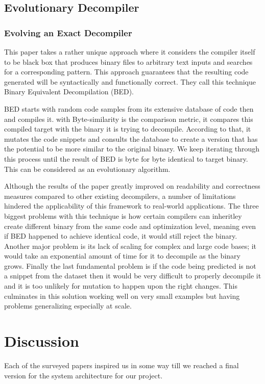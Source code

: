 \documentclass[conference,a4paper]{IEEEtran}
\begin{document}
\subsection{Evolutionary Decompiler}

\subsubsection{Evolving an Exact Decompiler}

This paper takes a rather unique approach where it considers the compiler itself to be black box that produces binary files to arbitrary text inputs and searches for a corresponding pattern.
This approach guarantees that the resulting code generated will be syntactically and functionally correct.
They call this technique Binary Equivalent Decompilation (BED).

BED starts with random code samples from its extensive database of code then and compiles it.
with Byte-similarity is the comparison metric, it compares this compiled target with the binary it is trying to decompile.
According to that, it mutates the code snippets and consults the database to create a version that has the potential to be more similar to the original binary.
We keep iterating through this process until the result of BED is byte for byte identical to target binary.
This can be considered as an evolutionary algorithm.

Although the results of the paper greatly improved on readability and correctness measures compared to other existing decompilers, a number of limitations hindered the applicability of this framework to real-world applications.
The three biggest problems with this technique is how certain compilers can inheritley create different binary from the same code and optimization level, meaning even if BED happened to achieve identical code, it would still reject the binary.
Another major problem is its lack of scaling for complex and large code bases; it would take an exponential amount of time for it to decompile as the binary grows.
Finally the last fundamental problem is if the code being predicted is not a snippet from the dataset then it would be very difficult to properly decompile it and it is too unlikely for mutation to happen upon the right changes.
This culminates in this solution working well on very small examples but having problems generalizing especially at scale.



\section{Discussion}
Each of the surveyed papers inspired us in some way till we reached a final version for the system architecture for our project.
\end{document}
